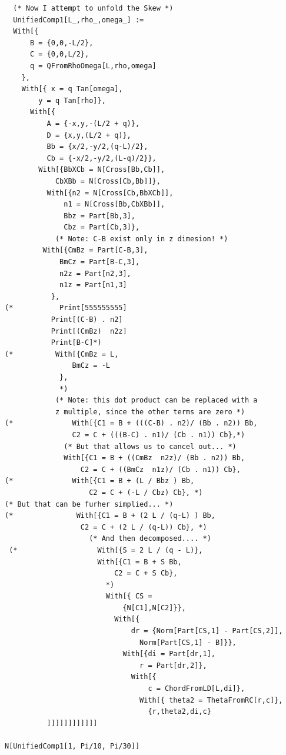 \documentclass[11pt]{article}
\begin{document}
{\begin{verbatim}
  (* Now I attempt to unfold the Skew *)
  UnifiedComp1[L_,rho_,omega_] :=
  With[{
      B = {0,0,-L/2},
      C = {0,0,L/2},
      q = QFromRhoOmega[L,rho,omega]
    },
    With[{ x = q Tan[omega],
        y = q Tan[rho]},
      With[{
          A = {-x,y,-(L/2 + q)},
          D = {x,y,(L/2 + q)},
          Bb = {x/2,-y/2,(q-L)/2},
          Cb = {-x/2,-y/2,(L-q)/2}},
        With[{BbXCb = N[Cross[Bb,Cb]],
            CbXBb = N[Cross[Cb,Bb]]},
          With[{n2 = N[Cross[Cb,BbXCb]],
              n1 = N[Cross[Bb,CbXBb]],
              Bbz = Part[Bb,3],
              Cbz = Part[Cb,3]},            
            (* Note: C-B exist only in z dimesion! *)
         With[{CmBz = Part[C-B,3],
             BmCz = Part[B-C,3],
             n2z = Part[n2,3],
             n1z = Part[n1,3]
           },
(*           Print[555555555]
           Print[(C-B) . n2]
           Print[(CmBz)  n2z]           
           Print[B-C]*)
(*          With[{CmBz = L,
                BmCz = -L
             },
             *)
            (* Note: this dot product can be replaced with a
            z multiple, since the other terms are zero *)
(*              With[{C1 = B + (((C-B) . n2)/ (Bb . n2)) Bb,
                C2 = C + (((B-C) . n1)/ (Cb . n1)) Cb},*)
              (* But that allows us to cancel out... *) 
              With[{C1 = B + ((CmBz  n2z)/ (Bb . n2)) Bb,
                  C2 = C + ((BmCz  n1z)/ (Cb . n1)) Cb}, 
(*              With[{C1 = B + (L / Bbz ) Bb,
                    C2 = C + (-L / Cbz) Cb}, *)
(* But that can be furher simplied... *)                  
(*               With[{C1 = B + (2 L / (q-L) ) Bb,
                  C2 = C + (2 L / (q-L)) Cb}, *)
                    (* And then decomposed.... *)
 (*                   With[{S = 2 L / (q - L)},
                      With[{C1 = B + S Bb,
                          C2 = C + S Cb},
                        *)
                        With[{ CS = 
                            {N[C1],N[C2]}},
                          With[{
                              dr = {Norm[Part[CS,1] - Part[CS,2]],
                                Norm[Part[CS,1] - B]}},
                            With[{di = Part[dr,1],
                                r = Part[dr,2]},
                              With[{
                                  c = ChordFromLD[L,di]},
                                With[{ theta2 = ThetaFromRC[r,c]},
                                  {r,theta2,di,c}
          ]]]]]]]]]]]]

N[UnifiedComp1[1, Pi/10, Pi/30]]









\end{verbatim}}
\end{document}
